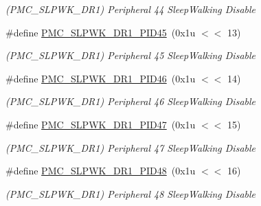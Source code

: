 \begin{DoxyCompactItemize}
\begin{DoxyCompactList}\small\item\em (P\+M\+C\+\_\+\+S\+L\+P\+W\+K\+\_\+\+D\+R1) Peripheral 44 Sleep\+Walking Disable \end{DoxyCompactList}\item 
\mbox{\label{group__SAMV71__PMC_gad070a6e877cf1a5db6f28d65a5aeb067}} 
\#define \mbox{\hyperlink{group__SAMV71__PMC_gad070a6e877cf1a5db6f28d65a5aeb067}{P\+M\+C\+\_\+\+S\+L\+P\+W\+K\+\_\+\+D\+R1\+\_\+\+P\+I\+D45}}~(0x1u $<$$<$ 13)
\begin{DoxyCompactList}\small\item\em (P\+M\+C\+\_\+\+S\+L\+P\+W\+K\+\_\+\+D\+R1) Peripheral 45 Sleep\+Walking Disable \end{DoxyCompactList}\item 
\mbox{\label{group__SAMV71__PMC_ga7e9a3273aacfe6cce7bd9c1b7839e00d}} 
\#define \mbox{\hyperlink{group__SAMV71__PMC_ga7e9a3273aacfe6cce7bd9c1b7839e00d}{P\+M\+C\+\_\+\+S\+L\+P\+W\+K\+\_\+\+D\+R1\+\_\+\+P\+I\+D46}}~(0x1u $<$$<$ 14)
\begin{DoxyCompactList}\small\item\em (P\+M\+C\+\_\+\+S\+L\+P\+W\+K\+\_\+\+D\+R1) Peripheral 46 Sleep\+Walking Disable \end{DoxyCompactList}\item 
\mbox{\label{group__SAMV71__PMC_gae32fd6bbbae61bc66c0e49f82fb51440}} 
\#define \mbox{\hyperlink{group__SAMV71__PMC_gae32fd6bbbae61bc66c0e49f82fb51440}{P\+M\+C\+\_\+\+S\+L\+P\+W\+K\+\_\+\+D\+R1\+\_\+\+P\+I\+D47}}~(0x1u $<$$<$ 15)
\begin{DoxyCompactList}\small\item\em (P\+M\+C\+\_\+\+S\+L\+P\+W\+K\+\_\+\+D\+R1) Peripheral 47 Sleep\+Walking Disable \end{DoxyCompactList}\item 
\mbox{\label{group__SAMV71__PMC_ga71fcb7b9c9f1d45cbf20671232affec3}} 
\#define \mbox{\hyperlink{group__SAMV71__PMC_ga71fcb7b9c9f1d45cbf20671232affec3}{P\+M\+C\+\_\+\+S\+L\+P\+W\+K\+\_\+\+D\+R1\+\_\+\+P\+I\+D48}}~(0x1u $<$$<$ 16)
\begin{DoxyCompactList}\small\item\em (P\+M\+C\+\_\+\+S\+L\+P\+W\+K\+\_\+\+D\+R1) Peripheral 48 Sleep\+Walking Disable \end{DoxyCompactList}\item 

\end{DoxyCompactItemize}
